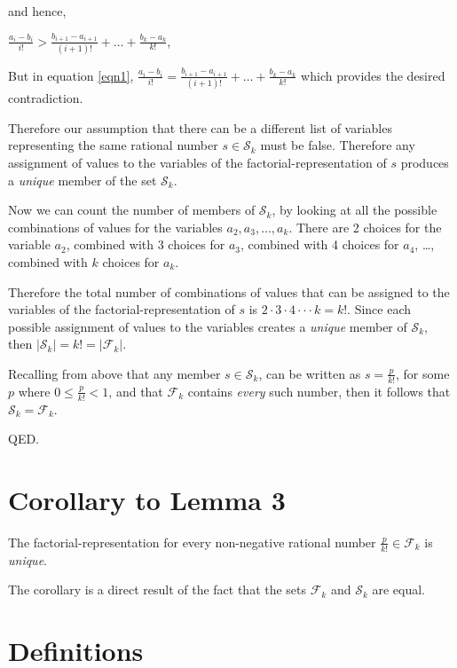 \documentclass{article}
\begin{document}
and hence,

\begin{center}
\(\frac{a_i - b_i}{i!} > \frac{b_{i+1} - a_{i+1}}{(i+1)!} + \dots{} + \frac{b_k - a_k}{k!}\),
\end{center}

But in equation \eqref{eqn1},
\(\frac{a_i - b_i}{i!} = \frac{b_{i+1} - a_{i+1}}{(i+1)!} + \dots{} + \frac{b_k - a_k}{k!}\)
which provides the desired contradiction.

Therefore our assumption that there can be a different list
of variables representing the same rational number \(s \in \mathcal{S}_k\) must be false.
Therefore any assignment of values to the variables of the factorial-representation of \(s\)
produces a \emph{unique} member of the set \(\mathcal{S}_k\).

Now we can count the number of members of \(\mathcal{S}_k\), by looking at all the
possible combinations of values for the variables \(a_2, a_3, \dots{}, a_k\).
There are 2 choices for the variable \(a_2\),
combined with 3 choices for \(a_3\),
combined with 4 choices for \(a_4\),
\dots{},
combined with \(k\) choices for \(a_k\).

Therefore the total number of combinations of values
that can be assigned to the variables of
the factorial-representation of \(s\)
is \(2\cdot{}3\cdot{}4\cdot\cdot{}\cdot{}k = k!\). Since each possible assignment of values
to the variables
creates a \emph{unique} member of \(\mathcal{S}_k\),
then \(\left|\mathcal{S}_k\right| = k! = \left|\mathcal{F}_k\right|\).

Recalling from above that any 
member \(s \in \mathcal{S}_k\),
can be written as \(s = \frac{p}{k!}\), for some \(p\) where 
\(0\le{}\frac{p}{k!}<1\), and that \(\mathcal{F}_k\) contains \emph{every} such number,
then it follows that \(\mathcal{S}_k = \mathcal{F}_k\).

QED.

\section*{Corollary to Lemma 3}

The factorial-representation for every non-negative rational number \(\frac{p}{k!} \in \mathcal{F}_k\) is 
\emph{unique}.

The corollary is a direct result of the fact that
the sets
\(\mathcal{F}_k\) and
\(\mathcal{S}_k\) are equal.

\section*{Definitions}
\end{document}

